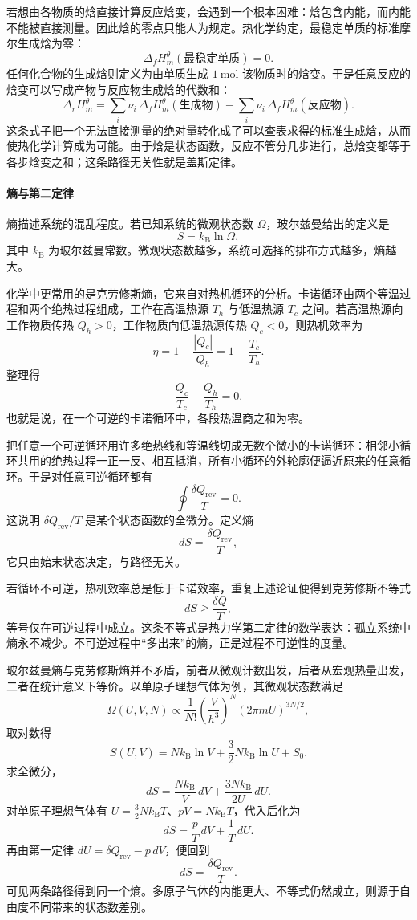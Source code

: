 \documentclass[UTF8]{ctexbook}
\begin{document}
若想由各物质的焓直接计算反应焓变，会遇到一个根本困难：焓包含内能，而内能不能被直接测量。因此焓的零点只能人为规定。热化学约定，最稳定单质的标准摩尔生成焓为零：
\[
\Delta_fH_m^\theta(\text{最稳定单质})=0 .
\]
任何化合物的生成焓则定义为由单质生成 \(1~\mathrm{mol}\) 该物质时的焓变。于是任意反应的焓变可以写成产物与反应物生成焓的代数和：
\[
\Delta_rH_m^\theta=\sum_i\nu_i\,\Delta_fH_m^\theta(\text{生成物})
-\sum_i\nu_i\,\Delta_fH_m^\theta(\text{反应物}).
\]
这条式子把一个无法直接测量的绝对量转化成了可以查表求得的标准生成焓，从而使热化学计算成为可能。由于焓是状态函数，反应不管分几步进行，总焓变都等于各步焓变之和；这条路径无关性就是盖斯定律。

\paragraph{熵与第二定律}

熵描述系统的混乱程度。若已知系统的微观状态数 \(\Omega\)，玻尔兹曼给出的定义是
\[
S=k_{\mathrm B}\ln\Omega ,
\]
其中 \(k_{\mathrm B}\) 为玻尔兹曼常数。微观状态数越多，系统可选择的排布方式越多，熵越大。

化学中更常用的是克劳修斯熵，它来自对热机循环的分析。卡诺循环由两个等温过程和两个绝热过程组成，工作在高温热源 \(T_h\) 与低温热源 \(T_c\) 之间。若高温热源向工作物质传热 \(Q_h>0\)，工作物质向低温热源传热 \(Q_c<0\)，则热机效率为
\[
\eta=1-\frac{|Q_c|}{Q_h}=1-\frac{T_c}{T_h}.
\]
整理得
\[
\frac{Q_c}{T_c}+\frac{Q_h}{T_h}=0 .
\]
也就是说，在一个可逆的卡诺循环中，各段热温商之和为零。

把任意一个可逆循环用许多绝热线和等温线切成无数个微小的卡诺循环：相邻小循环共用的绝热过程一正一反、相互抵消，所有小循环的外轮廓便逼近原来的任意循环。于是对任意可逆循环都有
\[
\oint\frac{\delta Q_{\mathrm{rev}}}{T}=0 .
\]
这说明 \(\delta Q_{\mathrm{rev}}/T\) 是某个状态函数的全微分。定义熵
\[
dS=\frac{\delta Q_{\mathrm{rev}}}{T},
\]
它只由始末状态决定，与路径无关。

若循环不可逆，热机效率总是低于卡诺效率，重复上述论证便得到克劳修斯不等式
\[
dS\geq\frac{\delta Q}{T},
\]
等号仅在可逆过程中成立。这条不等式是热力学第二定律的数学表达：孤立系统中熵永不减少。不可逆过程中“多出来”的熵，正是过程不可逆性的度量。

玻尔兹曼熵与克劳修斯熵并不矛盾，前者从微观计数出发，后者从宏观热量出发，二者在统计意义下等价。以单原子理想气体为例，其微观状态数满足
\[
\Omega(U,V,N)\propto\frac{1}{N!}\left(\frac{V}{h^3}\right)^{N}\left(2\pi mU\right)^{3N/2},
\]
取对数得
\[
S(U,V)=Nk_{\mathrm B}\ln V+\frac{3}{2}Nk_{\mathrm B}\ln U+S_0 .
\]
求全微分，
\[
dS=\frac{Nk_{\mathrm B}}{V}\,dV+\frac{3Nk_{\mathrm B}}{2U}\,dU .
\]
对单原子理想气体有 \(U=\frac{3}{2}Nk_{\mathrm B}T\)、\(pV=Nk_{\mathrm B}T\)，代入后化为
\[
dS=\frac{p}{T}\,dV+\frac{1}{T}\,dU .
\]
再由第一定律 \(dU=\delta Q_{\mathrm{rev}}-p\,dV\)，便回到
\[
dS=\frac{\delta Q_{\mathrm{rev}}}{T}.
\]
可见两条路径得到同一个熵。多原子气体的内能更大、不等式仍然成立，则源于自由度不同带来的状态数差别。
\end{document}
